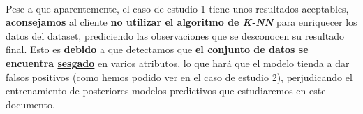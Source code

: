 \paragraph{}
Pese a que aparentemente, el caso de estudio 1 tiene unos resultados aceptables, \textbf{aconsejamos} al cliente \textbf{no utilizar el algoritmo de \textit{K-NN}} para enriquecer los datos del dataset, prediciendo las observaciones que se desconocen su resultado final. Esto es \textbf{debido} a que detectamos que \textbf{el conjunto de datos se encuentra \hyperref[resultados:knn_caracteristicas]{sesgado}}\cite{ref:sesgo} en varios atributos, lo que hará que el modelo tienda a dar falsos positivos (como hemos podido ver en el caso de estudio 2), perjudicando el entrenamiento de posteriores modelos predictivos que estudiaremos en este documento.